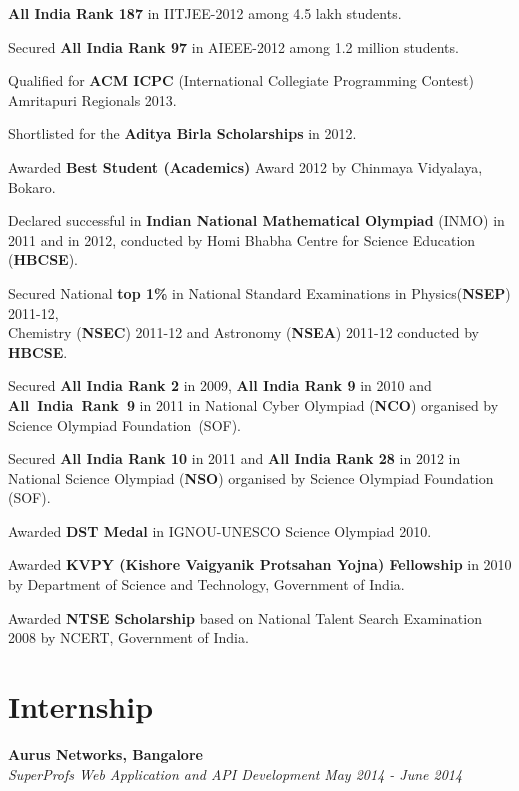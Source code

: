 \documentclass[margin,10pt]{resume}
\begin{document}
\begin{resume}
\begin{list2}
\begin{spacing}{1.4}
\item \textbf{All India Rank 187} in IITJEE-2012 among 4.5 lakh students.
\item Secured \textbf{All India Rank 97} in AIEEE-2012 among 1.2 million students.
\item Qualified for \textbf{ACM ICPC} (International Collegiate Programming Contest) \mbox{Amritapuri} Regionals 2013.
\item Shortlisted for the \textbf{Aditya Birla Scholarships} in 2012.
\item Awarded \textbf{Best Student (Academics)} Award 2012 by Chinmaya Vidyalaya, Bokaro.
\item Declared successful in \textbf{Indian National Mathematical Olympiad} (INMO) in 2011 and in 2012, conducted by Homi Bhabha Centre for Science Education (\textbf{HBCSE}).
\item Secured National \textbf{top 1\%} in National Standard Examinations in
Physics(\textbf {NSEP}) \mbox{2011-12,} \\Chemistry (\textbf {NSEC}) 2011-12 and Astronomy (\textbf{NSEA}) 2011-12 conducted by \textbf{HBCSE}.	
\item Secured \textbf{All India Rank 2} in 2009, \textbf{All India Rank 9} in 2010 and \mbox{\textbf{All India Rank 9}} in 2011 in National Cyber Olympiad (\textbf{NCO}) organised by Science Olympiad \mbox{Foundation (SOF).}
\item Secured \textbf{All India Rank 10} in 2011 and \textbf{All India Rank 28} in 2012 in National Science Olympiad (\textbf{NSO}) organised by Science Olympiad Foundation (SOF).
\item Awarded \textbf{DST Medal} in IGNOU-UNESCO Science Olympiad 2010.
\item Awarded \textbf{KVPY (Kishore Vaigyanik Protsahan Yojna) Fellowship} in 2010
by Department of Science and Technology, Government of India.
\item Awarded \textbf{NTSE Scholarship} based on National Talent Search Examination 2008 by NCERT, Government of India.
\end{spacing}
\end{list2}
\vspace{-5mm}
\section{\mysidestyle Internship}
\begin{list2}
\item \textbf{Aurus Networks, Bangalore}\\
\textsl{SuperProfs Web Application and API Development} \hfill \emph{May 2014 - June 2014}


\end{list2}
\end{resume}
\end{document}
